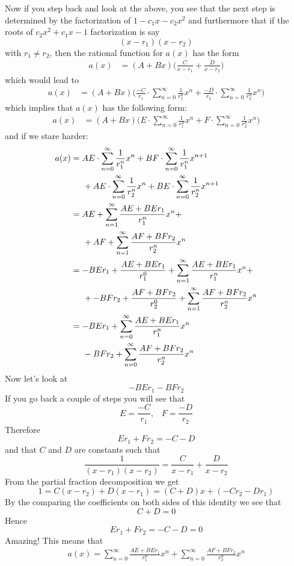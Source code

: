 Now if you step back and look at the above, you see that the next step
is determined by the factorization of $1 - c_1x - c_2x^2$ and furthermore
that if the roots of $c_2x^2 + c_1 x - 1$ factorization is say
\[
(x - r_1)(x - r_2)
\]
with $r_1 \neq r_2$, then the rational function for $a(x)$ has the
form
\begin{align*}
a(x) 
& = (A + Bx)\biggl( \frac{C}{x - r_1} + \frac{D}{x - r_2} \biggr ) 
\end{align*}
which would lead to
\begin{align*}
a(x) 
& = (A + Bx)\biggl( 
\frac{-C}{r_1} \cdot \sum_{n=0}^\infty \frac{1}{r_1^n}x^n 
+
\frac{-D}{r_2} \cdot \sum_{n=0}^\infty \frac{1}{r_2^n}x^n 
\biggr) 
\end{align*}
which implies that $a(x)$ has the following form:
\begin{align*}
a(x) 
& = (A + Bx)\biggl( 
E \cdot \sum_{n=0}^\infty \frac{1}{r_1^n}x^n 
+
F \cdot \sum_{n=0}^\infty \frac{1}{r_2^n}x^n 
\biggr) 
\end{align*}
and if we stare harder:
\begin{align*}
a(x) 
&=  
AE \cdot \sum_{n=0}^\infty \frac{1}{r_1^n}x^n +
BF \cdot \sum_{n=0}^\infty \frac{1}{r_1^n}x^{n+1}
\\ 
&\hskip 0.5cm
+
AE \cdot \sum_{n=0}^\infty \frac{1}{r_2^n}x^n +
BE \cdot \sum_{n=0}^\infty \frac{1}{r_2^n}x^{n+1} \\
&=  
AE + 
\sum_{n=1}^\infty \frac{AE + BEr_1}{r_1^n} x^n +
\\ 
&\hskip 0.5cm
+
AF + 
\sum_{n=1}^\infty \frac{AF + BFr_2}{r_2^n} x^n\\
&=  
-BEr_1 + \frac{AE + BEr_1}{r_1^0} +
\sum_{n=1}^\infty \frac{AE + BEr_1}{r_1^n} x^n +
\\ 
&\hskip 0.5cm
+
-BFr_2 + \frac{AF + BFr_2}{r_2^0} +
\sum_{n=1}^\infty \frac{AF + BFr_2}{r_2^n} x^n \\
&=  
-BEr_1 + 
\sum_{n=0}^\infty \frac{AE + BEr_1}{r_1^n} x^n
\\ 
&\hskip 0.5cm
-BFr_2 +
\sum_{n=0}^\infty \frac{AF + BFr_2}{r_2^n} x^n
\end{align*}
Now let's look at 
\[
-BE r_1 - BFr_2
\]
If you go back a couple of steps you will see that
\[
E = \frac{-C}{r_1}, \,\,\,\,\, 
F = \frac{-D}{r_2}
\]
Therefore
\[
Er_1 + Fr_2 = -C-D
\]
and that $C$ and $D$ are constants such that
\[
\frac{1}{(x-r_1)(x - r_2)} = \frac{C}{x - r_1} + \frac{D}{x - r_2}
\]
From the partial fraction decomposition we get
\[
1 = C(x - r_2) + D(x - r_1) = (C+D)x + (-Cr_2 -Dr_1) 
\]
By the comparing the coefficients on both sides of this identity we see that
\[
C + D = 0
\]
Hence
\[
Er_1 + Fr_2 = -C-D = 0
\]
Amazing!
This means that
\begin{align*}
a(x) 
=
\sum_{n=0}^\infty \frac{AE + BEr_1}{r_1^n} x^n 
+
\sum_{n=0}^\infty \frac{AF + BFr_2}{r_2^n} x^n
\end{align*}

